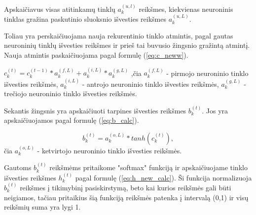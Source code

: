 Apskaičiavus visas atitinkamų tinklų \begin{math}a_k^{(u,l)}\end{math} reikšmes, kiekvienas neuroninis tinklas gražina paskutinio sluoksnio išvesties reikšmes \begin{math}a_k^{(u,L)}\end{math}.

Toliau yra perskaičiuojama nauja rekurentinio tinklo atmintis, pagal gautas neuroninių tinklų išvesties reikšmes ir prieš tai buvusio žingsnio gražintą atmintį. Nauja atmintis paskaičiuojama pagal formulę (\ref{eq:c_neww}).

\begin{math}\label{eq:c_neww}
  c_k^{(t)} = c_k^{(t-1)} * a_k^{(f,L)} + a_k^{(i,L)} * a_k^{(g,L)}
\end{math}
,čia \begin{math}a_k^{(f,L)}\end{math} - pirmojo neuroninio tinklo išvesties reikšmės, \begin{math}a_k^{(i,L)}\end{math} - antrojo neuroninio tinklo išvesties reikšmės, \begin{math}a_k^{(g,L)}\end{math} - trečiojo neuroninio tinklo išvesties reikšmės.

Sekantis žingsnis yra apskaičiuoti tarpines išvesties reikšmes \begin{math}b_k^{(t)}\end{math}. Jos yra apskaičiuojamos pagal formulę (\ref{eq:b_calc}).

\begin{equation}\label{eq:b_calc}
  b_k^{(t)} = a_k^{(o,L)}*tanh(c_k^{(t)}),
\end{equation}
čia \begin{math}a_k^{(o,L)}\end{math} - ketvirtojo neuroninio tinklo išvesties reikšmės.

Gautoms \begin{math}b_k^{(t)}\end{math} reikšmėms pritaikome "softmax" funkciją ir apskaičiuojame tinklo išvesties reikšmes \begin{math}h_k^{(t)}\end{math} pagal formulę (\ref{eq:h_new_calc}). Ši funkcija normalizuoja \begin{math}b_k^{(t)}\end{math} reikšmes į tikimybinį pasiskirstymą, beto kai kurios reikšmės gali būti neigiamos, tačiau pritaikius šią funkciją reikšmės patenka į intervalą (0,1) ir visų reikšmių suma yra lygi 1.

